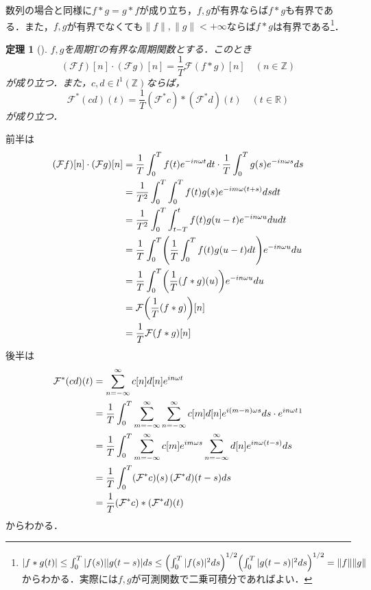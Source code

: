 \documentclass[dvipdfmx,a4j,10pt]{jsarticle}
\makeatletter
\theoremstyle{mystyle1}
\newtheorem{theorem}{定理}[section]
\theoremstyle{mystyle3}
\theoremstyle{mystyle4}
\theoremstyle{mystyle6}
\theoremstyle{mystyle2}
\theoremstyle{mystyle5}
\renewenvironment{proof}[1][\proofname]{\par
  \pushQED{\qed}%
  \normalfont
  \topsep6\p@\@plus6\p@ \trivlist
  \item[\hskip\labelsep{\bfseries\sffamily #1}]\ignorespaces
}{%
  \popQED\endtrivlist\@endpefalse
}
\renewcommand\proofname{証明}
\newenvironment{thm}[1][]
{\begin{tcolorbox}[
    enhanced,
    boxrule=0pt,
    arc=0mm,
    frame hidden,
    borderline west={2pt}{-4pt}{red},
    breakable = true
    ]
    \begin{theorem}[#1]
}
{\end{theorem}\end{tcolorbox}}
\makeatother
\begin{document}
数列の場合と同様に$f*g=g*f$が成り立ち，$f,g$が有界ならば$f*g$も有界である．また，$f,g$が有界でなくても$\|f\|,\|g\|<+\infty$ならば$f*g$は有界である\footnote{
	$ |f*g(t)|\leq \int_0^T |f(s)||g(t-s)|ds
		\leq\mleft(\int_0^T |f(s)|^2ds\mright)^{1/2}\mleft(\int_0^T |g(t-s)|^2ds\mright)^{1/2}
		=\|f\|\|g\|$からわかる．実際には$f,g$が可測関数で二乗可積分であればよい．
}．

\begin{thm}\label{thm:2-12}
	$f,g$を周期$T$の有界な周期関数とする．このとき
	\[
		(\mathcal{F}f)[n]\cdot (\mathcal{F}g)[n]=\frac{1}{T}\mathcal{F}(f*g)[n]\quad(n\in\mathbb{Z})
	\]
	が成り立つ．また，$c,d\in l^1(\mathbb{Z})$ならば，
	\[
		\mathcal{F}^*(cd)(t)=\frac{1}{T}(\mathcal{F}^*c)*(\mathcal{F}^*d)(t)\quad(t\in\mathbb{R})
	\]
	が成り立つ．
\end{thm}

\begin{proof}
	前半は
	\[
		\begin{split}
			(\mathcal{F}f)[n]\cdot (\mathcal{F}g)[n]
			&=\frac{1}{T}\int_0^T f(t)e^{-in\omega t}dt\cdot\frac{1}{T}\int_0^T g(s)e^{-in\omega s}ds \\
			&=\frac{1}{T^2}\int_0^T\int_0^T f(t)g(s)e^{-im\omega(t+s)}dsdt \\
			&=\frac{1}{T^2}\int_0^T\int_{t-T}^t f(t)g(u-t)e^{-in\omega u}dudt \\
			&=\frac{1}{T}\int_0^T\mleft(\frac{1}{T}\int_0^T f(t)g(u-t)dt\mright)e^{-in\omega u}du \\
			&=\frac{1}{T}\int_0^T \mleft(\frac{1}{T}(f*g)(u)\mright) e^{-in\omega u}du \\
			&=\mathcal{F}\mleft(\frac{1}{T}(f*g)\mright)[n] \\
			&=\frac{1}{T}\mathcal{F}(f*g)[n]
		\end{split}
	\]
	後半は
	\[
		\begin{split}
			\mathcal{F}^*(cd)(t)&=\sum_{n=-\infty}^\infty c[n]d[n]e^{in\omega t} \\
			&=\frac{1}{T}\int_0^T \sum_{m=-\infty}^\infty\sum_{n=-\infty}^\infty c[m]d[n] e^{i (m-n)\omega s}ds \cdot e^{in\omega t} \footnotemark \\
			&=\frac{1}{T}\int_0^T \sum_{m=-\infty}^\infty c[m]e^{im\omega s}\sum_{n=-\infty}^\infty d[n]e^{in\omega (t-s)} ds \\
			&=\frac{1}{T}\int_0^T(\mathcal{F}^*c)(s)\,(\mathcal{F}^*d)(t-s)ds \\
			&=\frac{1}{T}(\mathcal{F}^*c)*(\mathcal{F}^*d)(t)
		\end{split}
	\]
	からわかる．
\end{proof}
\end{document}
